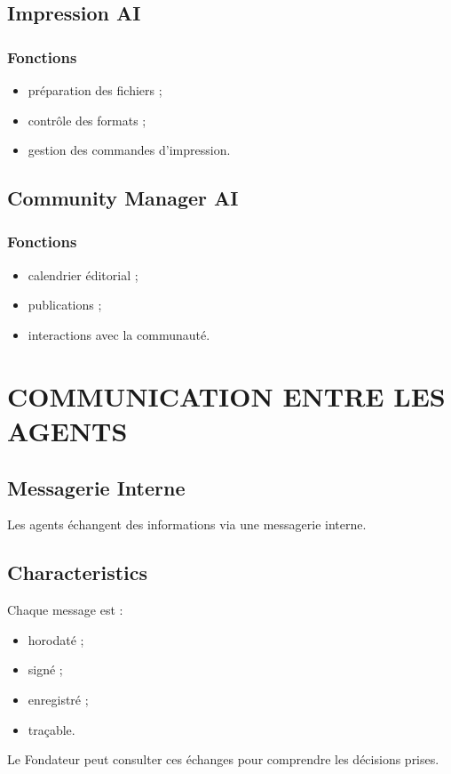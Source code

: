 \documentclass[12pt,a4paper,oneside]{book}
\begin{document}
\section{Impression AI}
\subsection{Fonctions}
\begin{itemize}
\item préparation des fichiers ;
\item contrôle des formats ;
\item gestion des commandes d'impression.
\end{itemize}

\section{Community Manager AI}
\subsection{Fonctions}
\begin{itemize}
\item calendrier éditorial ;
\item publications ;
\item interactions avec la communauté.
\end{itemize}

\chapter{COMMUNICATION ENTRE LES AGENTS}

\section{Messagerie Interne}
Les agents échangent des informations via une messagerie interne.

\section{Characteristics}
Chaque message est :
\begin{itemize}
\item horodaté ;
\item signé ;
\item enregistré ;
\item traçable.
\end{itemize}

Le Fondateur peut consulter ces échanges pour comprendre les décisions prises.
\end{document}
